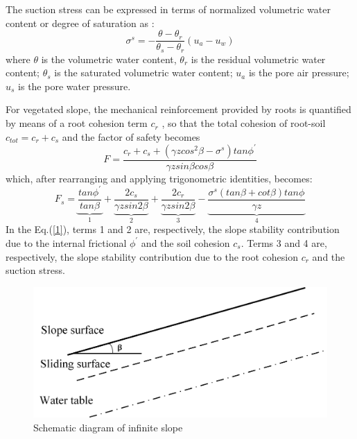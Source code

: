 The suction stress can be expressed in terms of normalized volumetric water content or degree of saturation as \citep{Lu2008Infinite}:
\begin{equation}\sigma^s = -\frac{\theta-\theta_r}{\theta_s-\theta_r}(u_a-u_w)\end{equation}
where $\theta$ is the volumetric water content, $\theta_r$ is the residual volumetric water content; $\theta_s$ is the saturated volumetric water content; $u_a$ is the pore air pressure; $u_s$ is the pore water pressure.



For vegetated slope, the mechanical reinforcement provided by roots is quantified by means of a root cohesion term $c_r$ \citep{Pollen2007Temporal,Arnone2016Modeling}, so that the total cohesion of root-soil $c_{tot} = c_r+c_s$ and the factor of safety becomes
\begin{equation}F=\frac{c_r+c_s+(\gamma z cos^2 \beta - \sigma^s) tan \phi^{'} }{\gamma z sin \beta cos \beta} \end{equation}
which, after rearranging and applying trigonometric identities, becomes:
\begin{equation}F_s=\underbrace{\frac{tan\phi^{'}}{tan\beta}}_{1}+\underbrace{\frac{2c_s}{\gamma z sin2\beta}}_{2}+\underbrace{\frac{2c_r}{\gamma z sin2\beta}}_{3} 
-\underbrace{\frac{\sigma^s(tan\beta+cot\beta)tan\phi^{}}{\gamma z}}_{4}\label{1}\end{equation}
In the Eq.(\ref{1}), terms 1 and 2 are, respectively, the slope stability contribution due to the internal frictional $\phi^{'}$ and the soil cohesion $c_s$. Terms 3 and 4 are, respectively, the slope stability contribution due to the root cohesion $c_r$ and the suction stress.

\begin{figure}
\includegraphics[width=1.0\textwidth]{slopemodel.jpg}
\caption{Schematic diagram of infinite slope}
\end{figure} 
\label{fig:sm}





